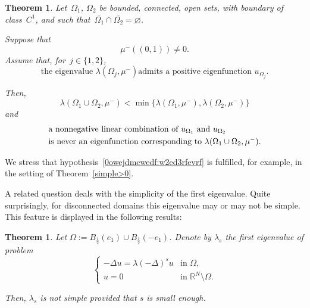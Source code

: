 \documentclass[12pt,a4paper,intlimits,sumlimits]{amsart}
\def \R {\mathbb{R}}
\theoremstyle{definition}
\theoremstyle{plain}
\newtheorem{theorem}[definition]{Theorem}
\renewcommand{\emptyset}{\varnothing}
\numberwithin{equation}{section}
\begin{document}
\begin{theorem}\label{ATTEHAMS}
Let~$\Omega_1$, $\Omega_2$ be bounded, connected, open sets,
with boundary of class~$C^1$,
and such that~$\overline{\Omega_1}\cap\overline{ \Omega_2}=\emptyset$.

Suppose that
\begin{equation}\label{0owejdmcwedf:w2ed3rfevrfs7mxwoevi}
\mu^-((0,1))\ne0.\end{equation}
Assume that, for~$j\in\{1,2\}$, 
\begin{equation}\label{0owejdmcwedf:w2ed3rfevrf}
{\mbox{the eigenvalue~$\lambda(\Omega_j,\mu^-)$
admits a positive eigenfunction~$u_{\Omega_j}$.}}\end{equation}

Then,
\begin{equation}\label{0owejdmcwedf:w2ed3rfevrf019kdcX3} \lambda(\Omega_1\cup\Omega_2,\mu^-)<\min\big\{
\lambda(\Omega_1,\mu^-),\lambda(\Omega_2,\mu^-)\big\}\end{equation}
and \begin{equation}\label{0owejdmcwedf:w2ed3rfevrf9}\begin{split}&{\mbox{a nonnegative linear combination of~$u_{\Omega_1}$ and~$u_{\Omega_2}$}}\\&{\mbox{is never an eigenfunction corresponding to~$ \lambda(\Omega_1\cup\Omega_2,\mu^-)$.}}\end{split}\end{equation}
\end{theorem}

We stress that hypothesis~\eqref{0owejdmcwedf:w2ed3rfevrf} is fulfilled,
for example, in the setting of Theorem~\ref{simple>0}.

A related question deals with the simplicity of the first eigenvalue.
Quite surprisingly, for disconnected domains this eigenvalue may or may not be simple. This feature is displayed in the following results:

\begin{theorem}\label{lambdasnonsemplice}
Let $\Omega:=B_\frac{1}{2}(e_1)\cup B_\frac{1}{2}(-e_1)$. Denote by $\lambda_s$ the first eigenvalue of problem
\[
\begin{cases}
-\Delta u=\lambda (-\Delta)^s u &\mbox{in }\Omega,
\\
u=0  &\mbox{in }\R^N\setminus \Omega.
\end{cases}
\]

Then, $\lambda_s$ is not simple provided that $s$ is small enough.
\end{theorem}
\end{document}
